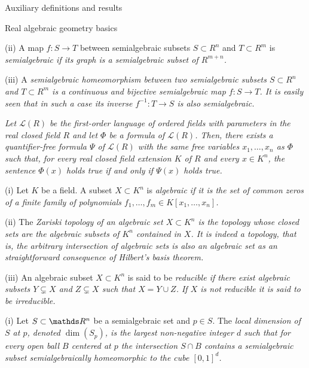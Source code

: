 \documentclass[11pt, a4paper, english, twoside, notitlepage, openright]{report}
\begin{document}
\begin{chapter}{Auxiliary definitions and results}
\begin{section}{Real algebraic geometry basics}
\begin{definitions}
	
(ii) A map $f:S\to T$ between semialgebraic subsets $S\subset R^n$ and $T\subset R^m$ is \em semialgebraic \em if its graph is a semialgebraic subset of $R^{m+n}$.  \end{definitions}


(iii) A \em semialgebraic homeomorphism \em between two semialgebraic subsets $S\subset R^n$ and $T\subset R^m$ is a continuous and bijective semialgebraic map $f:S\to T$. It is easily seen that in such a case its inverse $f^{-1}:T\to S$ is also semialgebraic.

\begin{theorem}\label{TP} \em Let ${\mathcal L}(R)$ be the first-order language of ordered fields with parameters in the real closed field $R$ and let $\Phi$ be a formula of ${\mathcal L}(R)$. Then, there exists a quantifier-free formula $\Psi$ of ${\mathcal L}(R)$ with the same free variables $x_1,\dots,x_n$ as $\Phi$ such that, for every real closed field extension $K$ of $R$ and every $x\in K^n$, the sentence $\Phi(x)$ holds true if and only if $\Psi(x)$ holds true.\em

\end{theorem}

\begin{definition}\label{zariski} (i) Let $K$ be a field. A subset $X\subset K^n$ is \em algebraic \em if it is the set of common zeros of a finite family of polynomials $f_1,\dots,f_m\in K[x_1,\dots, x_n]$. 

(ii) The \em Zariski topology \em of an algebraic set $X\subset K^n$ is the topology whose closed sets are the algebraic subsets of $K^n$ contained in $X$. It is indeed a topology, that is, the arbitrary intersection of algebraic sets is also an algebraic set as an straightforward consequence of Hilbert's basis theorem.

(iii) An algebraic subset $X\subset K^n$ is said to be \em reducible \em if there exist algebraic subsets $Y\subsetneq X$ and  $Z\subsetneq X$ such that $X=Y\cup Z$. If $X$ is not reducible it is said to be  \em irreducible. \em 
\end{definition}

\begin{definition}\label{pureDim} (i) Let $S\subset\R^n$ be a semialgebraic set and $p\in S$. The \em local dimension of $S$ at $p$, \em denoted $\dim(S_p)$, is the largest non-negative integer $d$ such that for every open ball $B$ centered at $p$ the intersection $S\cap B$ contains a semialgebraic subset semialgebraically homeomorphic to the cube $[0,1]^d$.


\end{definition}
\end{section}
\end{chapter}
\end{document}
